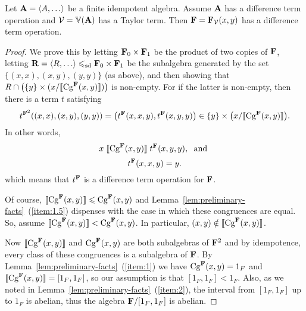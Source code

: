 \begin{theorem}
\label{thm:main-result}
Let $\bA = \<A, \dots\>$ be a finite idempotent algebra.
Assume $\mathbf{A}$ has a difference term operation and 
$\mathcal{V} = \operatorname{\mathbb{V}}(\mathbf{A})$ has a Taylor term.
Then $\mathbf{F} = \mathbf{F}_{\mathcal{V}}(x,y)$ has a difference term operation.
\end{theorem}
\begin{proof}
  
We prove this by 
letting $\mathbf{F}_0 \times \mathbf{F}_1$ be the product of two copies of $\mathbf{F}$,
letting $\bR = \<R, \dots\>  \sdp \bF_0 \times \bF_1$ be the subalgebra generated
by the set $\{(x, x), (x, y), (y, y)\}$ (as above), and then showing that
$R \cap \bigl(\{y\} \times (x/\llbracket \operatorname{Cg}^{\mathbf{F}}(x,y) \rrbracket)\bigr)$ is non-empty.  For if the latter is
non-empty, then there is a term $t$ satisfying
\[
t^{\mathbf{F}^2}((x,x),(x,y),(y,y)) =\bigl(t^{\mathbf{F}}(x,x,y), t^{\mathbf{F}}(x,y,y)\bigr) \in
\{y\} \times \bigl(x/\llbracket \operatorname{Cg}^{\mathbf{F}}(x,y) \rrbracket\bigr).
\]
In other words,
\begin{equation}
  \label{eq:dt2}
  x \mathrel{\llbracket \operatorname{Cg}^{\mathbf{F}}(x,y) \rrbracket} t^{\mathbf{F}}(x,y,y), \;  \text{ and }
\end{equation}
\begin{equation}
  \label{eq:dt2}
t^{\mathbf{F}}(x,x,y) = y.
\end{equation}
which means that $t^{\mathbf{F}}$ is a difference term operation for $\mathbf{F}$.

Of course, $\llbracket \operatorname{Cg}^{\mathbf{F}}(x,y) \rrbracket \leqslant \operatorname{Cg}^{\mathbf{F}}(x,y)$ and
Lemma~\ref{lem:preliminary-facts}~(\ref{item:1.5}) dispenses with
the case in which these congruences are equal.
So, %
assume
$\llbracket \operatorname{Cg}^{\mathbf{F}}(x,y) \rrbracket < \operatorname{Cg}^{\mathbf{F}}(x,y)$. In particular,
$(x,y) \notin \llbracket \operatorname{Cg}^{\mathbf{F}}(x,y) \rrbracket$.

Now $\llbracket \operatorname{Cg}^{\mathbf{F}}(x,y) \rrbracket$ and $\operatorname{Cg}^{\mathbf{F}}(x,y)$ are both subalgebras of $\mathbf{F}^2$
and by idempotence, every class of these congruences is a subalgebra of $\mathbf{F}$.
By Lemma~\ref{lem:preliminary-facts}~(\ref{item:1}) we have 
$\operatorname{Cg}^{\mathbf{F}}(x,y) = 1_F$ and $\llbracket \operatorname{Cg}^{\mathbf{F}}(x,y) \rrbracket = [1_F,1_F]$, so our assumption
is that $[1_F,1_F]< 1_F$.  Also, as we noted in
Lemma~\ref{lem:preliminary-facts}~(\ref{item:2}), the interval from 
$[1_F, 1_F]$ up to $1_F$ is abelian, thus the
algebra $\mathbf{F}/[1_F, 1_F]$ is abelian.


\end{proof}
